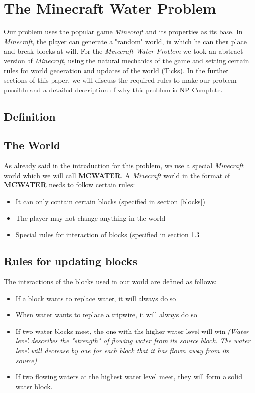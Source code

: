 \section{The Minecraft Water Problem}
\noindent Our problem uses the popular game \textit{Minecraft} and its properties as its base. In \textit{Minecraft}, the player can generate a "random" world, in which he can then place and break blocks at will. For the \textit{Minecraft Water Problem} we took an abstract version of \textit{Minecraft}, using the natural mechanics of the game and setting certain rules for world generation and updates of the world (Ticks). In the further sections of this paper, we will discuss the required rules to make our problem possible and a detailed description of why this problem is NP-Complete.

\subsection{Definition}


\subsection{The World} 

\noindent As already said in the introduction for this problem, we use a special \textit{Minecraft} world which we will call \textbf{MCWATER}. A \textit{Minecraft} world in the format of \textbf{MCWATER} needs to follow certain rules:

\begin{itemize}
    \item It can only contain certain blocks (specified in section \ref{blocks})
    \item The player may not change anything in the world
    \item Special rules for interaction of blocks (specified in section \ref{rules}
\end{itemize}

\subsection{Rules for updating blocks} \label{rules}
\noindent The interactions of the blocks used in our world are defined as follows:

\begin{itemize}
    \item If a block wants to replace water, it will always do so
    \item When water wants to replace a tripwire, it will always do so
    \item If two water blocks meet, the one with the higher water level will win \textit{(Water level describes the "strength" of flowing water from its source block. The water level will decrease by one for each block that it has flown away from its source)}
    \item If two flowing waters at the highest water level meet, they will form a solid water block.
\end{itemize}

